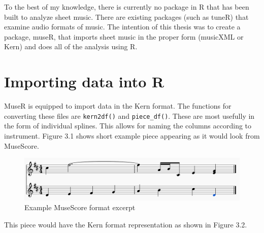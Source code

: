 \documentclass[12pt,twoside]{reedthesis}
\theoremstyle{definition}
\theoremstyle{definition}
\theoremstyle{definition}
\theoremstyle{remark}
\begin{document}
To the best of my knowledge, there is currently no package in R that has
been built to analyze sheet music. There are existing packages (such as
tuneR) that examine audio formats of music. The intention of this thesis
was to create a package, museR, that imports sheet music in the proper
form (musicXML or Kern) and does all of the analysis using R.

\section{Importing data into R}\label{importing-data-into-r}

MuseR is equipped to import data in the Kern format. The functions for
converting these files are \texttt{kern2df()} and \texttt{piece\_df()}.
These are most usefully in the form of individual splines. This allows
for naming the columns according to instrument. Figure 3.1 shows short
example piece appearing as it would look from MuseScore.
\begin{figure}[h]
\centering
\includegraphics[scale = .5]{images/ex1m.png}
\caption{Example MuseScore format excerpt}
\label{subd}
\end{figure}
This piece would have the Kern format representation as shown in Figure
3.2.
\end{document}
